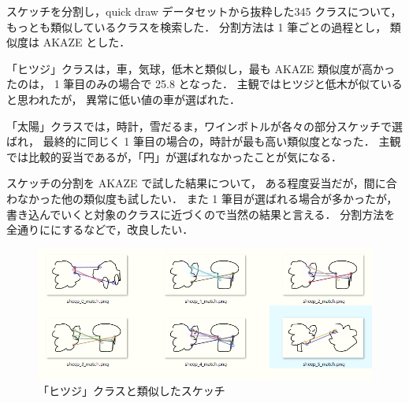 \documentclass[onecolumn]{ujarticle}   %
\begin{document}
スケッチを分割し，quick draw データセットから抜粋した345 クラスについて，
もっとも類似しているクラスを検索した．
分割方法は 1 筆ごとの過程とし，
類似度は AKAZE とした．

「ヒツジ」クラスは，車，気球，低木と類似し，最も AKAZE 類似度が高かったのは，
1 筆目のみの場合で 25.8 となった．
主観ではヒツジと低木が似ていると思われたが，
異常に低い値の車が選ばれた．

「太陽」クラスでは，時計，雪だるま，ワインボトルが各々の部分スケッチで選ばれ，
最終的に同じく 1 筆目の場合の，時計が最も高い類似度となった．
主観では比較的妥当であるが，「円」が選ばれなかったことが気になる．

スケッチの分割を AKAZE で試した結果について，
ある程度妥当だが，間に合わなかった他の類似度も試したい．
また 1 筆目が選ばれる場合が多かったが，
書き込んでいくと対象のクラスに近づくので当然の結果と言える．
分割方法を全通りににするなどで，改良したい．

\begin{figure}[th]
  \begin{center}
    \includegraphics[clip,width=140mm]{sheep.png}
    \caption{「ヒツジ」クラスと類似したスケッチ}
    \label{fig:result1_2}
  \end{center}
\end{figure}
\end{document}
